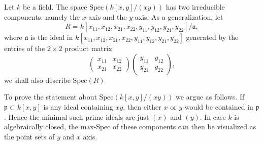 \begin{example}
\label{example-product-matrixes-zero}
Let $k$ be a field. The space $\text{Spec}(k[x, y]/(xy))$
has two irreducible components: namely the $x$-axis and the
$y$-axis. As a generalization, let
$$
R = k[x_{11}, x_{12}, x_{21}, x_{22}, y_{11}, y_{12}, y_{21}, y_{22}]/
\mathfrak a,
$$
where $\mathfrak a$ is the ideal in
$k[x_{11}, x_{12}, x_{21}, x_{22}, y_{11}, y_{12}, y_{21}, y_{22}]$
generated by the entries of the $2 \times 2$ product matrix
$$
\left(
\begin{matrix}
x_{11} & x_{12}\\
x_{21} & x_{22}
\end{matrix}
\right)
 \left(
\begin{matrix}
y_{11} & y_{12}\\
y_{21} & y_{22}
\end{matrix}
\right),
$$
we shall also describe $\text{Spec}(R)$

\medskip\noindent
To prove the statement about $\text{Spec}(k[x, y]/(xy))$ we argue as follows.
If $\mathfrak p \subset k[x, y]$ is any ideal containing $xy$, then either
$x$ or $y$ would be contained in $\mathfrak p$. Hence the minimal such
prime ideals are just $(x)$ and $(y)$. In case $k$ is
algebraically closed, the $\text{max-Spec}$ of these components
can then be visualized as the point sets of $y$ and $x$ axis.


\end{example}

